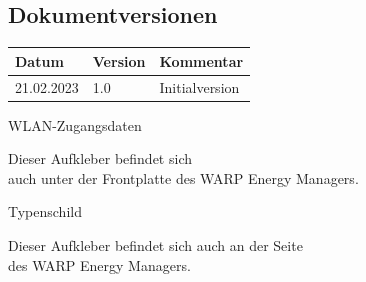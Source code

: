 \documentclass[a4paper,10pt]{article}
\begin{document}
\begin{multicols*}{2}
	\section{Dokumentversionen}
	\begin{tabular}{lll}
		\toprule
		Datum      & Version & Kommentar                       \\
		\midrule
		21.02.2023 & 1.0     & Initialversion                  \\
		\bottomrule
	\end{tabular}

	\vfill
	\null

	\columnbreak
\appendix



	\newpage
	\pagestyle{empty}
	\null
	\vfill
	WLAN-Zugangsdaten
	\begin{tcolorbox}[width=4.2cm,height=2.7cm, boxrule=0.25mm]

	\end{tcolorbox}
	Dieser Aufkleber befindet sich\\ auch unter der Frontplatte des WARP Energy
	Managers.
	\columnbreak

	\null
	\vfill
	Typenschild
	\begin{tcolorbox}[width=7.8cm,height=4.1cm, boxrule=0.25mm]

	\end{tcolorbox}
	Dieser Aufkleber befindet sich auch an der Seite\\ des WARP Energy Managers.
\end{multicols*}
\end{document}
